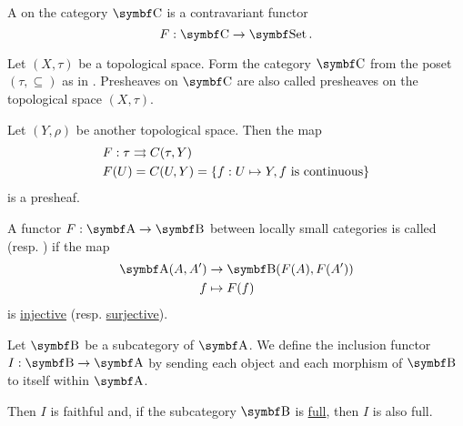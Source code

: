 \begin{definition}\label{def:presheaf}
  A  on the category \( \Cat{C} \) is a contravariant functor
  \begin{equation*}
    F: \Cat{C} \to \Cat{Set}.
  \end{equation*}
\end{definition}

\begin{example}\label{ex:topological_space_presheaf}
  Let \( (X, \tau) \) be a topological space. Form the category \( \Cat{C} \) from the poset \( (\tau, \subseteq) \) as in . Presheaves on \( \Cat{C} \) are also called presheaves on the topological space \( (X, \tau) \).

  Let \( (Y, \rho) \) be another topological space. Then the map
  \begin{align*}
     & F: \tau \rightrightarrows C(\tau, Y)                                     \\
     & F(U) = C(U, Y) = \{ f: U \mapsto Y, f \text{ is continuous} \}
  \end{align*}
  is a presheaf.
\end{example}

\begin{definition}\label{def:faithful_full_functor}
  A functor \( F: \Cat{A} \to \Cat{B} \) between locally small categories is called  (resp. ) if the map
  \begin{align*}
    \Cat{A}(A, A') & \to \Bold{B}(F(A), F(A')) \\
    f              & \mapsto F(f)
  \end{align*}
  is \hyperref[def:function_invertibility/injection]{injective} (resp. \hyperref[def:function_invertibility/surjection]{surjective}).
\end{definition}

\begin{example}\label{def:subcategory_functors}
  Let \( \Cat{B} \) be a subcategory of \( \Cat{A} \). We define the inclusion functor \( I: \Cat{B} \to \Cat{A} \) by sending each object and each morphism of \( \Cat{B} \) to itself within \( \Cat{A} \).

  Then \( I \) is faithful and, if the subcategory \( \Cat{B} \) is \hyperref[def:subcategory]{full}, then \( I \) is also full.
\end{example}

